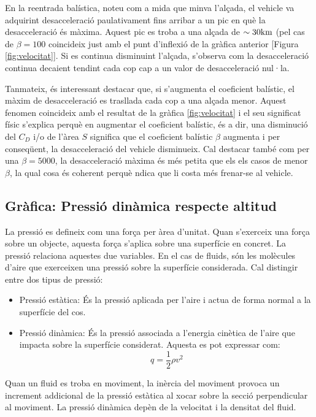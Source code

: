 En la reentrada balística, noteu com a mida que minva l'alçada, el vehicle va adquirint desacceleració paulativament fins arribar a un pic en què la desacceleració és màxima. Aquest pic es troba a una alçada de $\sim 30 \kilo\meter$ (pel cas de $\beta = 100$ coincideix just amb el punt d'inflexió de la gràfica anterior [Figura \ref{fig:velocitat}]. Si es continua disminuint l'alçada, s'observa com la desacceleració continua decaient tendint cada cop cap a un valor de desacceleració nul·la.

Tanmateix, és interessant destacar que, si s'augmenta el coeficient balístic, el màxim de desacceleració es trasllada cada cop a una alçada menor. Aquest fenomen coincideix amb el resultat de la gràfica \ref{fig:velocitat} i el seu significat físic s'explica perquè en augmentar el coeficient balístic, és a dir, una disminució del $C_D$ i/o de l'àrea $S$ significa que el coeficient balístic $\beta$ augmenta i per conseqüent, la desacceleració del vehicle disminueix. Cal destacar també com per una $\beta=5000$, la desacceleració màxima és més petita que els els casos de menor $\beta$, la qual cosa és coherent perquè ndica que li costa més frenar-se al vehicle.

\newpage
\subsection{Gràfica: Pressió dinàmica respecte altitud}
La pressió es defineix com una força per àrea d’unitat. Quan s'exerceix una força sobre un objecte, aquesta força s'aplica sobre una superfície en concret. La pressió relaciona aquestes due variables. En el cas de fluids, són les molècules d'aire que exerceixen una pressió sobre la superfície considerada. Cal distingir entre dos tipus de pressió:
\begin{itemize}
    \item Pressió estàtica: És la pressió aplicada per l’aire i actua de forma normal a la superfície del cos.
    \item Pressió dinàmica: És la pressió associada a l’energia cinètica de l’aire que impacta sobre la superfície considerat. Aquesta es pot expressar com:
    \begin{equation}
        q = \frac{1}{2} \rho v^2
    \end{equation}
\end{itemize}
Quan un fluid es troba en moviment, la inèrcia del moviment provoca un increment addicional de la pressió estàtica al xocar sobre la secció perpendicular al moviment. La pressió dinàmica depèn de la velocitat i la densitat del fluid.

